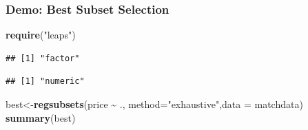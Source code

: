 \documentclass[
  shownotes,
  xcolor={svgnames},
  hyperref={colorlinks,citecolor=DarkBlue,linkcolor=DarkRed,urlcolor=DarkBlue}
  ]{beamer}
\newenvironment{Shaded}{\begin{snugshade}}{\end{snugshade}}
\newcommand{\DataTypeTok}[1]{\textcolor[rgb]{0.13,0.29,0.53}{#1}}
\newcommand{\KeywordTok}[1]{\textcolor[rgb]{0.13,0.29,0.53}{\textbf{#1}}}
\newcommand{\NormalTok}[1]{#1}
\newcommand{\OperatorTok}[1]{\textcolor[rgb]{0.81,0.36,0.00}{\textbf{#1}}}
\newcommand{\StringTok}[1]{\textcolor[rgb]{0.31,0.60,0.02}{#1}}
\begin{document}
\begin{frame}[fragile]
\frametitle{Demo: Best Subset Selection}
\begin{Shaded}
\begin{Highlighting}[]
\KeywordTok{require}\NormalTok{(}\StringTok{"leaps"}\NormalTok{)}
\end{Highlighting}
\end{Shaded}

\begin{scriptsize}
\begin{Shaded}
\end{Shaded}

\begin{verbatim}
## [1] "factor"
\end{verbatim}

\begin{Shaded}
\end{Shaded}

\begin{verbatim}
## [1] "numeric"
\end{verbatim}
\begin{Shaded}
\end{Shaded}

\begin{Shaded}
\begin{Highlighting}[]
\NormalTok{best\textless{}{-}}\KeywordTok{regsubsets}\NormalTok{(price }\OperatorTok{\textasciitilde{}}\StringTok{ }\NormalTok{., }\DataTypeTok{method=}\StringTok{"exhaustive"}\NormalTok{,}\DataTypeTok{data =}\NormalTok{ matchdata)}
\KeywordTok{summary}\NormalTok{(best)}
\end{Highlighting}
\end{Shaded}
\end{scriptsize}

\end{frame}
\end{document}
